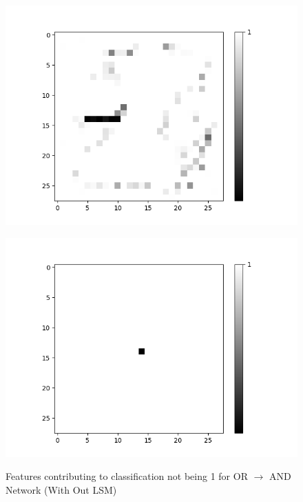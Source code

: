 \begin{minipage}[t]{0.4\textwidth}
	\vspace{0px}
	\begin{figure}[H]
		\centering
		\begin{minipage}[b]{0.45\textwidth}
			\captionsetup{labelformat=empty}
			\includegraphics[width=\textwidth]{OR-AND(WO-LSM)(1)/DontLike/True/Layer0-Neuron-28.png}
			\label{}
		\end{minipage}
	
		\medskip
	
		\begin{minipage}[b]{0.45\textwidth}
			\captionsetup{labelformat=empty}
			\includegraphics[width=\textwidth]{OR-AND(WO-LSM)(1)/DontLike/False/Layer0-Neuron-28.png}
			\label{}
		\end{minipage}
		\caption{Features contributing to classification not being 1 for OR $\rightarrow$ AND Network (With Out LSM)}
		\label{fig:or-and-net-without-lsm-neg}
		\hfill
	\end{figure}
\end{minipage}

